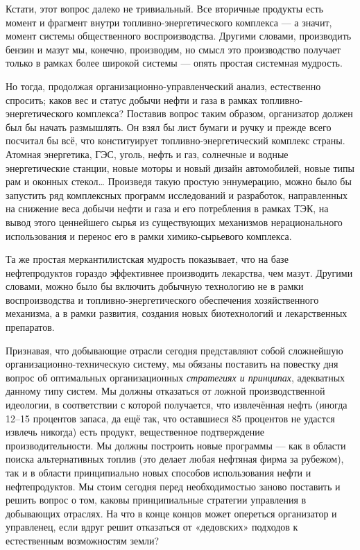 \documentclass[11pt,a4paper]{article}
\begin{document}
Кстати, этот вопрос далеко не тривиальный. Все вторичные продукты есть момент
и фрагмент внутри топливно-энергетического комплекса — а значит, момент
системы общественного воспроизводства. Другими словами, производить бензин и
мазут мы, конечно, производим, но смысл это производство получает только в
рамках более широкой системы — опять простая системная мудрость. 

Но тогда, продолжая организационно-управленческий анализ, естественно
спросить; каков вес и статус добычи нефти и газа в рамках
топливно-энергетического комплекса? Поставив вопрос таким образом, организатор
должен был бы начать размышлять. Он взял бы лист бумаги и ручку и прежде всего
посчитал бы всё, что конституирует топливно-энергетический комплекс страны.
Атомная энергетика, ГЭС, уголь, нефть и газ, солнечные и водные энергетические
станции, новые моторы и новый дизайн автомобилей, новые типы рам и оконных
стекол… Произведя такую простую эннумерацию, можно было бы запустить ряд
комплексных программ исследований и разработок, направленных на снижение веса
добычи нефти и газа и его потребления в рамках ТЭК, на вывод этого ценнейшего
сырья из существующих механизмов нерационального использования и перенос его в
рамки химико-сырьевого комплекса.

Та же простая меркантилистская мудрость показывает, что на базе нефтепродуктов
гораздо эффективнее производить лекарства, чем мазут. Другими словами, можно
было бы включить добычную технологию не в рамки воспроизводства и
топливно-энергетического обеспечения хозяйственного механизма, а в рамки
развития, создания новых биотехнологий и лекарственных препаратов. 

Признавая, что добывающие отрасли сегодня представляют собой сложнейшую
организа\-ционно-техническую систему, мы обязаны поставить на повестку дня
вопрос об оптимальных организационных \emph{стратегиях и принципах},
адекватных данному типу систем. Мы должны отказаться от ложной
производственной идеологии, в соответствии с которой получается, что
извлечённая нефть (иногда 12–15 процентов запаса, да ещё так, что оставшиеся
85 процентов не удастся извлечь никогда) есть продукт, вещественное
подтверждение производительности.  Мы должны построить новые программы — как в
области поиска альтернативных топлив (это делает любая нефтяная фирма за
рубежом), так и в области принципиально новых способов использования нефти и
нефтепродуктов. Мы стоим сегодня перед необходимостью заново поставить и
решить вопрос о том, каковы принципиальные стратегии управления в добывающих
отраслях. На что в конце концов может опереться организатор и управленец, если
вдруг решит отказаться от «дедовских» подходов к естественным возможностям
земли?
\end{document}
